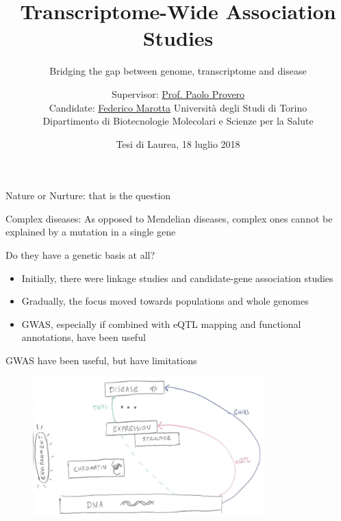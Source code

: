 \documentclass[aspectratio=169,12pt]{beamer}
\title{Transcriptome-Wide Association Studies}
\subtitle{\normalsize Bridging the gap between genome, transcriptome and 
disease}
\author[Federico Marotta]
{
	\footnotesize
	Supervisor: \href{mailto:paolo.provero@unito.it}{Prof. Paolo 
		Provero}
	\\
	Candidate: \href{mailto:federico.marotta@edu.unito.it}{Federico 
		Marotta}
	\vfill
	\scriptsize
	Università degli Studi di Torino
	\\
	Dipartimento di Biotecnologie Molecolari e Scienze per la Salute
	\vfill
}
\institute[UniTo, DBMSS]
{



}
\date{\tiny Tesi di Laurea, 18 luglio 2018}
\begin{document}
\maketitle


\begin{frame}{Nature or Nurture: that is the question}

	\bigskip

	\begin{block}{Complex diseases:}
		As opposed to Mendelian diseases, complex ones cannot be 
explained by a mutation in a single gene
	\end{block}

	\bigskip

	Do they have a genetic basis at all?

	\pause

	\begin{itemize}
		\item Initially, there were \alert{linkage studies} and 
\alert{candidate-gene association studies}
		\item Gradually, the focus moved towards \alert{populations and 
whole genomes}
		\item \alert{GWAS}, especially if combined with eQTL mapping and 
functional annotations, have been useful
	 \end{itemize}


\end{frame}

\begin{frame}{GWAS have been useful, but have limitations}

	\begin{figure}
		\includegraphics[width=0.8\textwidth]{introduction/summary}
	\end{figure}

\end{frame}
\end{document}
